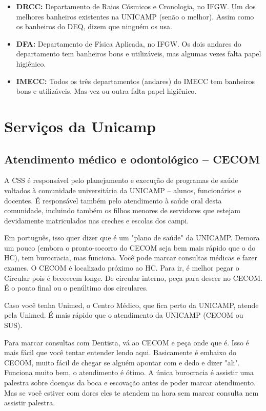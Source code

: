 \documentclass[a4paper,10pt, twocolumn]{article}
\begin{document}
\begin{itemize}
\item  \textbf{DRCC:} Departamento de Raios Cósmicos e Cronologia, no IFGW. Um dos melhores banheiros existentes na UNICAMP (senão o melhor). Assim como os banheiros do DEQ, dizem que ninguém os usa.
\end{itemize}

\begin{itemize}
\item  \textbf{DFA:} Departamento de Física Aplicada, no IFGW. Os dois andares do departamento tem banheiros bons e utilizáveis, mas algumas vezes falta papel higiênico.
\end{itemize}

\begin{itemize}
\item  \textbf{IMECC:} Todos os três departamentos (andares) do IMECC tem banheiros bons e utilizáveis. Mas vez ou outra falta papel higiênico.
\end{itemize}

\section{Serviços da Unicamp}
\subsection{Atendimento médico e odontológico -- CECOM}
A CSS é responsável pelo planejamento e execução de programas de saúde voltados
à comunidade universitária da UNICAMP -- alunos, funcionários e docentes.
É responsável também pelo atendimento à saúde oral desta comunidade, incluindo
também os filhos menores de servidores que estejam devidamente matriculados nas
creches e escolas dos campi.

Em português, isso quer dizer que é um "plano de saúde" da UNICAMP. Demora um
pouco (embora o pronto-socorro do CECOM seja bem mais rápido que o do HC), tem
burocracia, mas funciona. Você pode marcar consultas médicas e fazer exames.
O CECOM é localizado próximo ao HC. Para ir, é melhor pegar o Circular pois
é beeeeeem longe. De circular interno, peça para descer no CECOM. É o ponto
final ou o penúltimo dos circulares.

Caso você tenha Unimed, o Centro Médico, que fica perto da UNICAMP, atende pela
Unimed. É mais rápido que o atendimento da UNICAMP (CECOM ou SUS).

Para marcar consultas com Dentista, vá ao CECOM e peça onde que é. Isso é mais
fácil que você tentar entender lendo aqui. Basicamente é embaixo do CECOM, muito
fácil de chegar se alguém apontar com e dedo e dizer "ali". Funciona muito bem,
o atendimento é ótimo. A única burocracia é assistir uma palestra sobre doenças
da boca e escovação antes de poder marcar atendimento. Mas se você estiver com
dores eles te atendem na hora sem marcar consulta nem assistir palestra.
\end{document}
